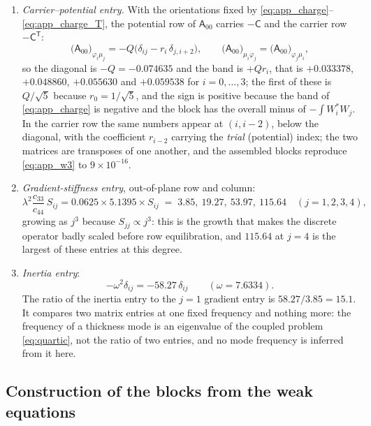 \begin{enumerate}
statement that a higher Legendre mode stores more gradient energy, and hence that diffusion penalizes thickness structure.
\item \emph{Carrier--potential entry.}  With the orientations fixed by
\eqref{eq:app_charge}--\eqref{eq:app_charge_T}, the potential row of
$\mathsf A_{00}$ carries $-\mathsf C$ and the carrier row
$-\mathsf C^{\mathsf T}$:
\begin{equation}
\label{eq:app_w3}
\bigl(\mathsf A_{00}\bigr)_{\varphi_i\mu_j}
=-Q\bigl(\delta_{ij}-r_i\,\delta_{j,i+2}\bigr),
\qquad
\bigl(\mathsf A_{00}\bigr)_{\mu_i\varphi_j}
=\bigl(\mathsf A_{00}\bigr)_{\varphi_j\mu_i},
\end{equation}
so the diagonal is $-Q=-0.074635$ and the band is $+Qr_i$, that is $+0.033378$,
$+0.048860$, $+0.055630$ and $+0.059538$ for $i=0,\dots,3$; the first of these is
$Q/\sqrt{5}$ because $r_0=1/\sqrt{5}$, and the sign is positive because the
band of \eqref{eq:app_charge} is negative and the block has the overall minus
of $-\int W_i^{*}W_j$.  In the carrier row the same numbers appear at
$(i,i-2)$, below the diagonal, with the coefficient $r_{i-2}$ carrying the
\emph{trial} (potential) index; the two matrices are transposes of one another, and
the assembled blocks reproduce \eqref{eq:app_w3} to $9\times10^{-16}$.
\item \emph{Gradient-stiffness entry}, out-of-plane row and column:
\begin{equation}
\label{eq:app_w4}
\lambda^{2}\frac{c_{33}}{c_{44}}\,S_{ij}
=0.0625\times5.1395\times S_{ij}
\;=\;3.85,\ 19.27,\ 53.97,\ 115.64 \quad (j=1,2,3,4),
\end{equation}
growing as $j^{3}$ because $S_{jj}\propto j^{3}$: this is the growth that makes
the discrete operator badly scaled before row equilibration, and $115.64$ at $j=4$ is the largest of these entries at
this degree.
\item \emph{Inertia entry}:
\begin{equation}
\label{eq:app_w5}
-\omega^{2}\delta_{ij}=-58.27\,\delta_{ij}\qquad(\omega=7.6334).
\end{equation}
The ratio of the inertia entry to the $j=1$ gradient entry is
$58.27/3.85=15.1$.  It compares two matrix entries at one fixed frequency and
nothing more: the frequency of a thickness mode is an eigenvalue of the coupled
problem \eqref{eq:quartic}, not the ratio of two entries, and no mode frequency is
inferred from it here.
\end{enumerate}

\subsection{Construction of the blocks from the weak equations}

